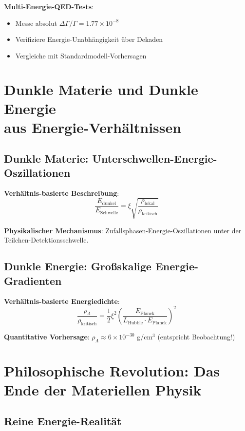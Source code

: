 \documentclass[12pt,a4paper]{article}
\newcommand{\Efield}{E}
\newcommand{\xipar}{\xi}
\theoremstyle{definition}
\theoremstyle{remark}
\begin{document}
	\textbf{Multi-Energie-QED-Tests}:
	\begin{itemize}
		\item Messe absolut $\Delta\Gamma/\Gamma = 1.77 \times 10^{-8}$
		\item Verifiziere Energie-Unabhängigkeit über Dekaden
		\item Vergleiche mit Standardmodell-Vorhersagen
	\end{itemize}
	
	\section{Dunkle Materie und Dunkle Energie\\ aus Energie-Verhältnissen}
	
	\subsection{Dunkle Materie: Unterschwellen-Energie-Oszillationen}
	
	\textbf{Verhältnis-basierte Beschreibung}:
	\begin{equation}
		\frac{\Efield_{\text{dunkel}}}{\Efield_{\text{Schwelle}}} = \xipar \sqrt{\frac{\rho_{\text{lokal}}}{\rho_{\text{kritisch}}}}
	\end{equation}
	
	\textbf{Physikalischer Mechanismus}: Zufallsphasen-Energie-Oszillationen unter der Teilchen-Detektionsschwelle.
	
	\subsection{Dunkle Energie: Großskalige Energie-Gradienten}
	
	\textbf{Verhältnis-basierte Energiedichte}:
	\begin{equation}
		\frac{\rho_{\Lambda}}{\rho_{\text{kritisch}}} = \frac{1}{2} \xipar^2 \left(\frac{E_{\text{Planck}}}{L_{\text{Hubble}} \cdot E_{\text{Planck}}}\right)^2
	\end{equation}
	
	\textbf{Quantitative Vorhersage}: $\rho_{\Lambda} \approx 6 \times 10^{-30}$ g/cm$^3$ (entspricht Beobachtung!)
	
	\section{Philosophische Revolution: Das Ende der Materiellen Physik}
	
	\subsection{Reine Energie-Realität}
	
\end{document}
